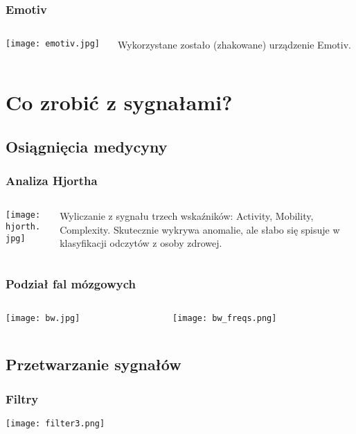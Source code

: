 \documentclass{beamer}
\begin{document}
\begin{frame} \frametitle{Emotiv}
\begin{columns}
\begin{column}{5cm}
\texttt{[image: emotiv.jpg]}
\end{column}
\begin{column}{5cm}	
Wykorzystane zostało (zhakowane) urządzenie Emotiv.
\end{column}
\end{columns}
\end{frame}

\section{Co zrobić z sygnałami?}
\subsection{Osiągnięcia medycyny}
\begin{frame} \frametitle{Analiza Hjortha}
\begin{columns}
\begin{column}{5cm}
\texttt{[image: hjorth.jpg]}
\end{column}
\begin{column}{5cm}
Wyliczanie z sygnału trzech wskaźników: Activity, Mobility, Complexity.
Skutecznie wykrywa anomalie, ale słabo się spisuje w klasyfikacji odczytów z osoby zdrowej.
\end{column}
\end{columns} 
\end{frame}

\begin{frame} \frametitle{Podział fal mózgowych}
\begin{columns}
\begin{column}{5cm}
\texttt{[image: bw.jpg]}
\end{column}
\begin{column}{5cm}
\texttt{[image: bw\_freqs.png]}
\end{column}
\end{columns} 
\end{frame}

\subsection{Przetwarzanie sygnałów}
\begin{frame} \frametitle{Filtry}
\texttt{[image: filter3.png]}
\end{frame}
\end{document}

